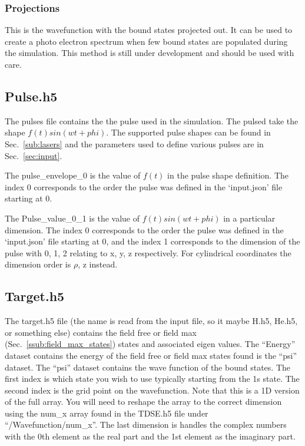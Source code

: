 \documentclass{article}
\begin{document}
\subsubsection{Projections} %
\label{ssub:projections}
This is the wavefunction with the bound states projected out. It can be used to create a photo electron spectrum when few bound states are populated during the simulation. This method is still under development and should be used with care.

\subsection{Pulse.h5} %
\label{sub:pulse_h5}
The pulses file contains the the pulse used in the simulation. The pulsed take the shape $f(t)sin(wt+phi)$. The supported pulse shapes can be found in Sec.~\ref{sub:lasers} and the parameters used to define various pulses are in Sec.~\ref{sec:input}.

The pulse\_envelope\_0 is the value of $f(t)$ in the pulse shape definition. The index 0 corresponds to the order the pulse was defined in the `input.json' file starting at 0.

The Pulse\_value\_0\_1 is the value of $f(t)sin(wt+phi)$ in a particular dimension. The index 0 corresponds to the order the pulse was defined in the `input.json' file starting at 0, and the index 1 corresponds to the dimension of the pulse with 0, 1, 2 relating to x, y, z respectively. For cylindrical coordinates the dimension order is $\rho$, z instead.

\subsection{Target.h5} %
\label{sub:target_h5}
The target.h5 file (the name is read from the input file, so it maybe H.h5, He.h5, or something else) contains the field free or field max (Sec.~\ref{ssub:field_max_states}) states and associated eigen values. The ``Energy'' dataset contains the energy of the field free or field max states found is the ``psi'' dataset. The ``psi'' dataset contains the wave function of the bound states. The first index is which state you wish to use typically starting from the 1s state. The second index is the grid point on the wavefunction. Note that this is a 1D version of the full array. You will need to reshape the array to the correct dimension using the num\_x array found in the TDSE.h5 file under ``/Wavefunction/num\_x''. The last dimension is handles the complex numbers with the 0th element as the real part and the 1st element as the imaginary part.
\end{document}
